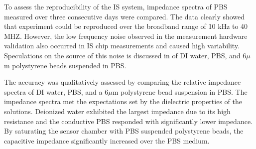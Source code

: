 \par To assess the reproducibility of the IS system, impedance spectra of PBS measured over three consecutive days were compared. The data clearly showed that experiment could be reproduced over the broadband range of 10 kHz to 40 MHZ. However, the low frequency noise observed in the measurement hardware validation also occurred in IS chip measurements and caused high variability. Speculations on the source of this noise is discussed in  of DI water, PBS, and 6$\mu$m polystyrene beads suspended in PBS.

\par The accuracy was qualitatively assessed by comparing the relative impedance spectra of DI water, PBS, and a 6$\mu$m polystyrene bead suspension in PBS. The impedance spectra met the expectations set by the dielectric properties of the solutions. Deionized water exhibited the largest impedance due to its high resistance and the conductive PBS responded with significantly lower impedance. By saturating the sensor chamber with PBS suspended polystyrene beads, the capacitive impedance significantly increased over the PBS medium. 




